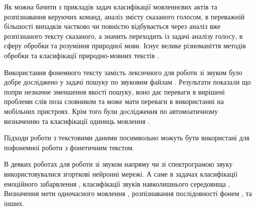 
Як можна бачити з прикладів задач класифікації мовленнєвих актів та розпізнавання керуючих команд, аналіз змісту сказаного голосом, в переважній більшості випадків частково чи повністю відбувається через аналіз вже розпізнаного тексту сказаного, а значить переходить із задачі аналізу голосу, в сферу обробки та розуміння природної мови. Існує велике різноманіття методів обробки та класифікації природно-мовних текстів \cite{Mironczuk_2018,Altinel_2018,Hartmann_2018,Kim_2014,Britz_2015_2,Britz_2015,Marchenko_2005}.


Використання фонемного тексту замість лексичного для роботи зі звуком було добре досліджено у задачі пошуку по звуковим файлам \cite{Ng_C_2000,Ng_K_2000,Witbrock_1997}. Результати показали що попри незначне зменшення якості пошуку, воно дає переваги в вирішені проблеми слів поза словником та може мати переваги в використанні на мобільних пристроях. Крім того були дослідження по автомоатичному визначенню та класифікації одиниць мовлення \cite{Sharma_2018}.

Підходи роботи з текстовими даними посимвольно \cite{Kim_2016,Zhang_2015_2,Zhang_2015,Santos_2014} можуть бути використані для пофонемної роботи з фонетичним текстом.


В деяких роботах для роботи зі звуком напряму чи зі спектрограмою звуку використовувалися згорткові нейронні мережі. А саме в задачах класифікації емоційного забарвлення \cite{Weisskirchen_2017}, класифікації звуків навколишнього середовища \cite{Boddapati_2017}, Визначення мети одночасного мовлення \cite{Chowdhury_2018}, розпізнавання послідовності фонем \cite{Abdel_2012,Zhang_2017}, та інших.


